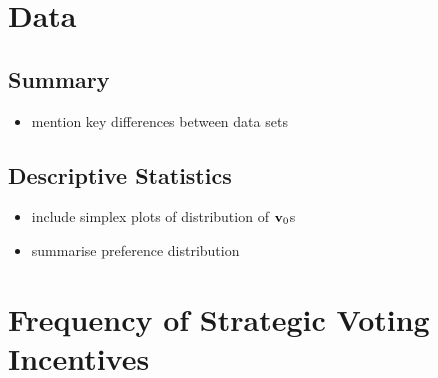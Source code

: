 \documentclass[11pt, letter, margin = 2 in]{article}
\begin{document}
\section{Data}

\subsection{Summary}

\begin{itemize}
	\item mention key differences between data sets
\end{itemize}

\subsection{Descriptive Statistics}


\begin{itemize}
	\item include simplex plots of distribution of ${\bf v}_0$s
	\item summarise preference distribution
\end{itemize}

\section{Frequency of Strategic Voting Incentives}
\end{document}
